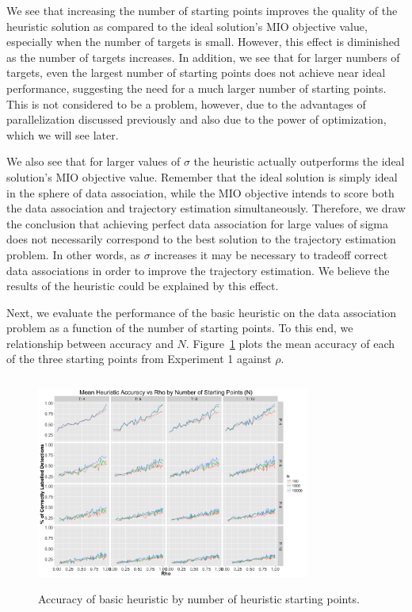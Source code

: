 \documentclass[journal]{IEEEtran}
\begin{document}
We see that increasing the number of starting points improves the quality of the heuristic solution as compared to the ideal solution's MIO objective value, especially when the number of targets is small. However, this effect is diminished as the number of targets increases. In addition, we see that for larger numbers of targets, even the largest number of starting points does not achieve near ideal performance, suggesting the need for a much larger number of starting points. This is not considered to be a problem, however, due to the advantages of parallelization discussed previously and also due to the power of optimization, which we will see later. 

We also see that for larger values of $\sigma$ the heuristic actually outperforms the ideal solution's MIO objective value. Remember that the ideal solution is simply ideal in the sphere of data association, while the MIO objective intends to score both the data association and trajectory estimation simultaneously. Therefore, we draw the conclusion that achieving perfect data association for large values of sigma does not necessarily correspond to the best solution to the trajectory estimation problem. In other words, as $\sigma$ increases it may be necessary to tradeoff correct data associations in order to improve the trajectory estimation. We believe the results of the heuristic could be explained by this effect.

Next, we evaluate the performance of the basic heuristic on the data association problem as a function of the number of starting points. To this end, we relationship between accuracy and $N$. Figure~\ref{fig:Basic_Heuristic_Accuracy} plots the mean accuracy of each of the three starting points from Experiment 1 against $\rho$. 

\begin{figure}[h]
  \centering
  \includegraphics[width=9cm, height=7cm]{Basic_Heuristic_Accuracy}
  \caption{Accuracy of basic heuristic by number of heuristic starting points.}
  \label{fig:Basic_Heuristic_Accuracy}
\end{figure}
\end{document}
